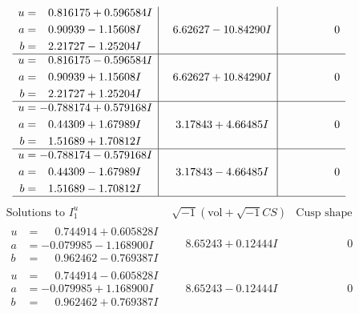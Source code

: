 \documentclass[1p]{elsarticle_modified}
\theoremstyle{definition}
\newcommand{\I}{\sqrt{-1}}
\begin{document}
$$\begin{array}{c|c|c}
\begin{aligned}
u &= \phantom{-}0.816175 + 0.596584 I \\
a &= \phantom{-}0.90939 - 1.15608 I \\
b &= \phantom{-}2.21727 - 1.25204 I\end{aligned}
 & \phantom{-}6.62627 - 10.84290 I & \phantom{-0.000000 } 0 \\ \hline\begin{aligned}
u &= \phantom{-}0.816175 - 0.596584 I \\
a &= \phantom{-}0.90939 + 1.15608 I \\
b &= \phantom{-}2.21727 + 1.25204 I\end{aligned}
 & \phantom{-}6.62627 + 10.84290 I & \phantom{-0.000000 } 0 \\ \hline\begin{aligned}
u &= -0.788174 + 0.579168 I \\
a &= \phantom{-}0.44309 + 1.67989 I \\
b &= \phantom{-}1.51689 + 1.70812 I\end{aligned}
 & \phantom{-}3.17843 + 4.66485 I & \phantom{-0.000000 } 0 \\ \hline\begin{aligned}
u &= -0.788174 - 0.579168 I \\
a &= \phantom{-}0.44309 - 1.67989 I \\
b &= \phantom{-}1.51689 - 1.70812 I\end{aligned}
 & \phantom{-}3.17843 - 4.66485 I & \phantom{-0.000000 } 0\\
 \hline 
 \end{array}$$\newpage$$\begin{array}{c|c|c}  
\text{Solutions to }I^u_{1}& \I (\text{vol} + \sqrt{-1}CS) & \text{Cusp shape}\\
 \hline 
\begin{aligned}
u &= \phantom{-}0.744914 + 0.605828 I \\
a &= -0.079985 - 1.168900 I \\
b &= \phantom{-}0.962462 - 0.769387 I\end{aligned}
 & \phantom{-}8.65243 + 0.12444 I & \phantom{-0.000000 } 0 \\ \hline\begin{aligned}
u &= \phantom{-}0.744914 - 0.605828 I \\
a &= -0.079985 + 1.168900 I \\
b &= \phantom{-}0.962462 + 0.769387 I\end{aligned}
 & \phantom{-}8.65243 - 0.12444 I & \phantom{-0.000000 } 0 \\ \hline\begin{aligned}

\end{aligned}
\end{array}$$
\end{document}
